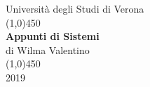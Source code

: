 \documentclass[a4paper, 12pt, italian]{book}
\begin{document}
\begin{titlepage}

\begin{center}
\LARGE{Università degli Studi di Verona}\\
\line(1,0){450}\\
\vspace{10em}
\Huge{\textbf{Appunti di Sistemi}}\\
\vspace{14em}
\huge{di Wilma Valentino}\\
\line(1,0){450}\\
\LARGE{2019}\\
\end{center}

\end{titlepage}

\tableofcontents



\end{document}
